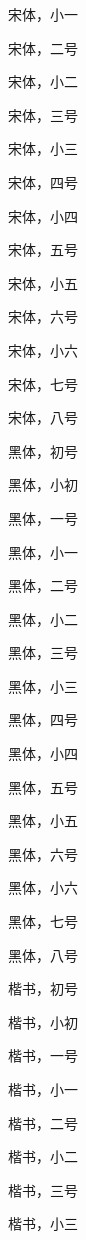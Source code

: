 {\songti{} 宋体，小一}

{\songti{} 宋体，二号}

{\songti{} 宋体，小二}

{\songti{} 宋体，三号}

{\songti{} 宋体，小三}

{\songti{} 宋体，四号}

{\songti{} 宋体，小四}

{\songti{} 宋体，五号}

{\songti{} 宋体，小五}

{\songti{} 宋体，六号}

{\songti{} 宋体，小六}

{\songti{} 宋体，七号}

{\songti{} 宋体，八号}

{\heiti{} 黑体，初号}

{\heiti{} 黑体，小初}

{\heiti{} 黑体，一号}

{\heiti{} 黑体，小一}

{\heiti{} 黑体，二号}

{\heiti{} 黑体，小二}

{\heiti{} 黑体，三号}

{\heiti{} 黑体，小三}

{\heiti{} 黑体，四号}

{\heiti{} 黑体，小四}

{\heiti{} 黑体，五号}

{\heiti{} 黑体，小五}

{\heiti{} 黑体，六号}

{\heiti{} 黑体，小六}

{\heiti{} 黑体，七号}

{\heiti{} 黑体，八号}

{\kaishu{} 楷书，初号}

{\kaishu{} 楷书，小初}

{\kaishu{} 楷书，一号}

{\kaishu{} 楷书，小一}

{\kaishu{} 楷书，二号}

{\kaishu{} 楷书，小二}

{\kaishu{} 楷书，三号}

{\kaishu{} 楷书，小三}

